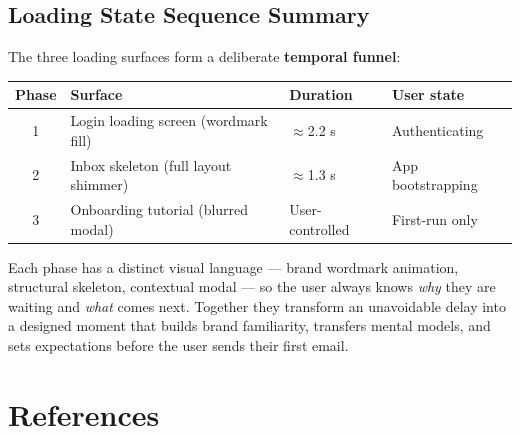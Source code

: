 \documentclass[12pt,a4paper]{report}
\begin{document}
{{%
\section{Loading State Sequence Summary}

The three loading surfaces form a deliberate \textbf{temporal funnel}:

\begin{center}
\begin{tabular}{@{}clll@{}}
  \toprule
  \textbf{Phase} & \textbf{Surface} & \textbf{Duration} & \textbf{User state} \\
  \midrule
  1 & Login loading screen (wordmark fill) & $\approx$2.2 s & Authenticating     \\
  2 & Inbox skeleton (full layout shimmer) & $\approx$1.3 s & App bootstrapping  \\
  3 & Onboarding tutorial (blurred modal)  & User-controlled & First-run only     \\
  \bottomrule
\end{tabular}
\end{center}

Each phase has a distinct visual language — brand wordmark animation, structural skeleton,
contextual modal — so the user always knows \textit{why} they are waiting and \textit{what}
comes next. Together they transform an unavoidable delay into a designed moment that builds
brand familiarity, transfers mental models, and sets expectations before the user sends
their first email.

\chapter*{References}

}}
\end{document}
